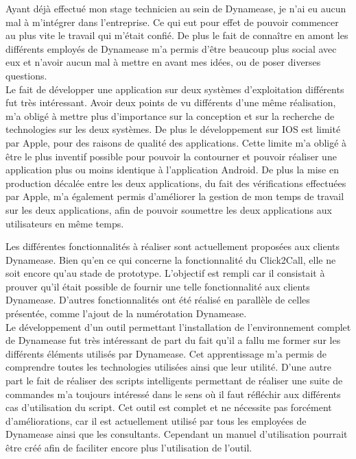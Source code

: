 Ayant déjà effectué mon stage technicien au sein de Dynamease, je n'ai eu aucun mal à m'intégrer dans l'entreprise. Ce qui eut pour effet de pouvoir commencer au plus vite le travail qui m'était confié. De plus le fait de connaître en amont les différents employés de Dynamease m'a permis d'être beaucoup plus social avec eux et n'avoir aucun mal à mettre en avant mes idées, ou de poser diverses questions.\\

Le fait de développer une application sur deux systèmes d'exploitation différents fut très intéressant. Avoir deux points de vu différents d'une même réalisation, m'a obligé à mettre plus d'importance sur la conception et sur la recherche de technologies sur les deux systèmes. De plus le développement sur IOS est limité par Apple, pour des raisons de qualité des applications. Cette limite m'a obligé à être le plus inventif possible pour pouvoir la contourner et pouvoir réaliser une application plus ou moins identique à l'application Android. De plus la mise en production décalée entre les deux applications, du fait des vérifications effectuées par Apple, m'a également permis d'améliorer la gestion de mon temps de travail sur les deux applications, afin de pouvoir soumettre les deux applications aux utilisateurs en même temps.

Les différentes fonctionnalités à réaliser sont actuellement proposées aux clients Dynamease. Bien qu'en ce qui concerne la fonctionnalité du Click2Call, elle ne soit encore qu'au stade de prototype. L'objectif est rempli car il consistait à prouver qu'il était possible de fournir une telle fonctionnalité aux clients Dynamease. D'autres fonctionnalités ont été réalisé en parallèle de celles présentée, comme l'ajout de la numérotation Dynamease.\\

Le développement d'un outil permettant l'installation de l'environnement complet de Dynamease fut très intéressant de part du fait qu'il a fallu me former sur les différents éléments utilisés par Dynamease. Cet apprentissage m'a permis de comprendre toutes les technologies utilisées ainsi que leur utilité. D'une autre part le fait de réaliser des scripts intelligents permettant de réaliser une suite de commandes m'a toujours intéressé dans le sens où il faut réfléchir aux différents cas d'utilisation du script. Cet outil est complet et ne nécessite pas forcément d'améliorations, car il est actuellement utilisé par tous les employées de Dynamease ainsi que les consultants. Cependant un manuel d'utilisation pourrait être créé afin de faciliter encore plus l'utilisation de l'outil.\\

